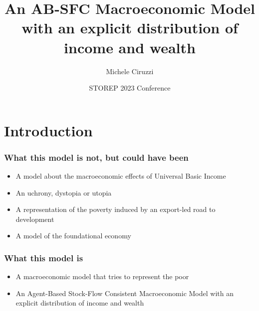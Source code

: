 \documentclass[]{beamer}
\title[DAS]{An AB-SFC Macroeconomic Model with an explicit distribution of income and wealth}
\author[Ciruzzi, M.]{Michele Ciruzzi}
\institute[UnInsubria]{Università degli Studi dell'Insubria}
\date{STOREP 2023 Conference}
\begin{document}
\frame{\titlepage}

\section{Introduction}
\begin{frame}
	\frametitle{What this model is not, but could have been}
	\begin{itemize}
		\item A model about the macroeconomic effects of Universal Basic Income
		\item An uchrony, dystopia or utopia
		\item A representation of the poverty induced by an export-led road to development
		\item A model of the foundational economy
	\end{itemize}
\end{frame}

\begin{frame}
	\frametitle{What this model is}
	\begin{itemize}
		\item A macroeconomic model that tries to represent the poor
		\item An Agent-Based Stock-Flow Consistent Macroeconomic Model with an explicit distribution of income and wealth
	\end{itemize}
\end{frame}
\end{document}
